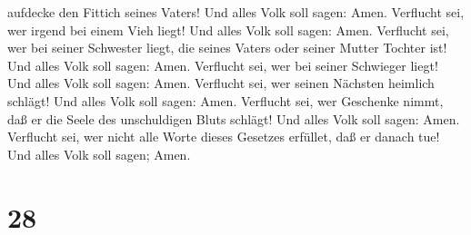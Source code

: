 aufdecke den Fittich seines Vaters! Und alles Volk soll sagen: Amen.
 Verflucht sei, wer irgend bei einem Vieh liegt! Und alles
Volk soll sagen: Amen.  Verflucht sei, wer bei seiner
Schwester liegt, die seines Vaters oder seiner Mutter Tochter ist! Und
alles Volk soll sagen: Amen.  Verflucht sei, wer bei seiner
Schwieger liegt! Und alles Volk soll sagen: Amen. 
Verflucht sei, wer seinen Nächsten heimlich schlägt! Und alles Volk soll
sagen: Amen.  Verflucht sei, wer Geschenke nimmt, daß er
die Seele des unschuldigen Bluts schlägt! Und alles Volk soll sagen:
Amen.  Verflucht sei, wer nicht alle Worte dieses Gesetzes
erfüllet, daß er danach tue! Und alles Volk soll sagen; Amen.

\hypertarget{section-27}{%
\section{28}\label{section-27}}

